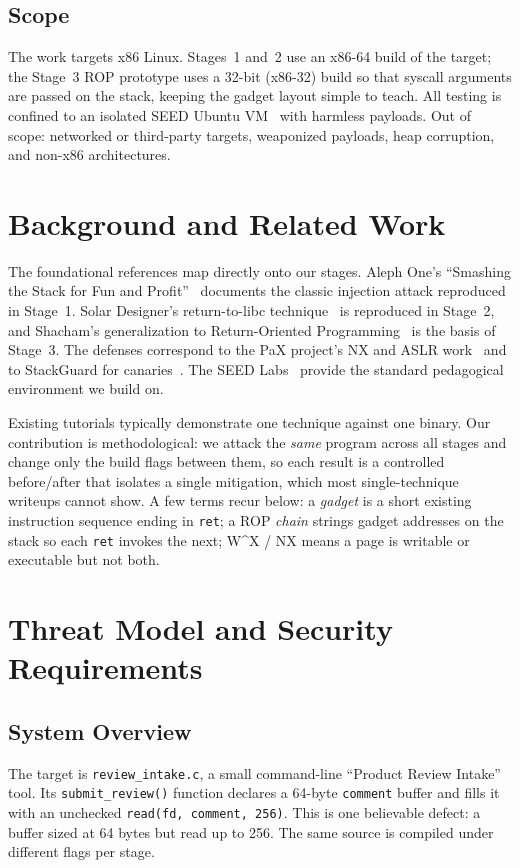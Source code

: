 \documentclass[10pt,twocolumn,letterpaper]{article}
\newcommand{\code}[1]{\texttt{\small #1}}
\begin{document}
\subsection{Scope}
The work targets x86 Linux. Stages~1 and~2 use an x86-64 build of the target;
the Stage~3 ROP prototype uses a 32-bit (x86-32) build so that syscall arguments
are passed on the stack, keeping the gadget layout simple to teach. All testing
is confined to an isolated SEED Ubuntu VM~\cite{seed} with harmless payloads.
Out of scope: networked or third-party targets, weaponized payloads, heap
corruption, and non-x86 architectures.

\section{Background and Related Work}
The foundational references map directly onto our stages. Aleph One's
``Smashing the Stack for Fun and Profit''~\cite{alephone} documents the classic
injection attack reproduced in Stage~1. Solar Designer's return-to-libc
technique~\cite{solar} is reproduced in Stage~2, and Shacham's generalization to
Return-Oriented Programming~\cite{rop} is the basis of Stage~3. The defenses
correspond to the PaX project's NX and ASLR work~\cite{pax} and to StackGuard
for canaries~\cite{stackguard}. The SEED Labs~\cite{seed} provide the standard
pedagogical environment we build on.

Existing tutorials typically demonstrate one technique against one binary. Our
contribution is methodological: we attack the \emph{same} program across all
stages and change only the build flags between them, so each result is a
controlled before/after that isolates a single mitigation, which most
single-technique writeups cannot show. A few terms recur below: a \emph{gadget}
is a short existing instruction sequence ending in \code{ret}; a ROP
\emph{chain} strings gadget addresses on the stack so each \code{ret} invokes
the next; W\^{}X / NX means a page is writable or executable but not both.

\section{Threat Model and Security Requirements}

\subsection{System Overview}
The target is \code{review\_intake.c}, a small command-line ``Product Review
Intake'' tool. Its \code{submit\_review()} function declares a 64-byte
\code{comment} buffer and fills it with an unchecked
\code{read(fd, comment, 256)}. This is one believable defect: a buffer sized at
64 bytes but read up to 256. The same source is compiled under different flags
per stage.
\end{document}
